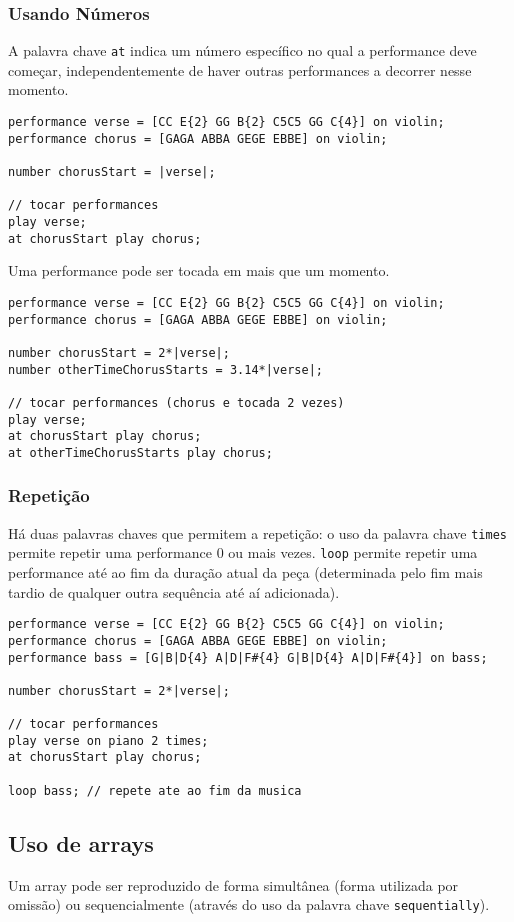 \documentclass{article}
\begin{document}
\subsubsection{Usando Números}
A palavra chave \texttt{at} indica um número específico no qual a performance deve começar, independentemente de haver outras performances a decorrer nesse momento. 
\begin{lstlisting} 
performance verse = [CC E{2} GG B{2} C5C5 GG C{4}] on violin;
performance chorus = [GAGA ABBA GEGE EBBE] on violin;

number chorusStart = |verse|;

// tocar performances
play verse;
at chorusStart play chorus;
\end{lstlisting}

Uma performance pode ser tocada em mais que um momento.
\begin{lstlisting} 
performance verse = [CC E{2} GG B{2} C5C5 GG C{4}] on violin;
performance chorus = [GAGA ABBA GEGE EBBE] on violin;

number chorusStart = 2*|verse|;
number otherTimeChorusStarts = 3.14*|verse|;

// tocar performances (chorus e tocada 2 vezes)
play verse;
at chorusStart play chorus;
at otherTimeChorusStarts play chorus;
\end{lstlisting}

\subsubsection{Repetição}
Há duas palavras chaves que permitem a repetição: o uso da palavra chave \texttt{times} permite repetir uma performance 0 ou mais vezes. \texttt{loop} permite repetir uma performance até ao fim da duração atual da peça (determinada pelo fim mais tardio de qualquer outra sequência até aí adicionada).
\begin{lstlisting} 
performance verse = [CC E{2} GG B{2} C5C5 GG C{4}] on violin;
performance chorus = [GAGA ABBA GEGE EBBE] on violin;
performance bass = [G|B|D{4} A|D|F#{4} G|B|D{4} A|D|F#{4}] on bass;

number chorusStart = 2*|verse|;

// tocar performances
play verse on piano 2 times;
at chorusStart play chorus;

loop bass; // repete ate ao fim da musica
\end{lstlisting}

\subsection{Uso de arrays}
Um array pode ser reproduzido de forma simultânea (forma utilizada por omissão) ou sequencialmente (através do uso da palavra chave \texttt{sequentially}).
\end{document}
